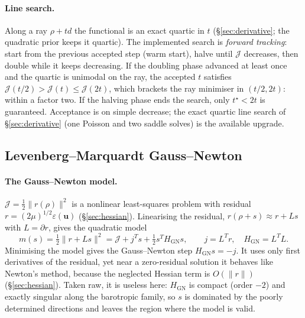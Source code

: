 \documentclass[11pt]{article}
\newcommand{\Jf}{\mathscr{J}}  %
\newcommand{\eps}{\varepsilon}
\newcommand{\bu}{\mathbf{u}}
\newcommand{\norm}[1]{\lVert #1 \rVert}
\begin{document}
\paragraph{Line search.} Along a ray $\rho + t d$ the functional is an
exact quartic in $t$ (\S\ref{sec:derivative}; the quadratic prior keeps it
quartic). The implemented search is \emph{forward tracking}: start from
the previous accepted step (warm start), halve until $\Jf $ decreases, then
double while it keeps decreasing. If the doubling phase advanced at least
once and the quartic is unimodal on the ray, the accepted $t$ satisfies
$\Jf (t/2) > \Jf (t) \le \Jf (2t)$, which brackets the ray minimiser in
$(t/2, 2t)$: within a factor two. If the halving phase ends the search,
only $t^\star < 2t$ is guaranteed. Acceptance is on simple decrease; the
exact quartic line search of \S\ref{sec:derivative} (one Poisson and two
saddle solves) is the available upgrade.

\subsection{Levenberg--Marquardt Gauss--Newton}
\label{sec:lm}

\paragraph{The Gauss--Newton model.} $\Jf  = \tfrac12\norm{r(\rho)}^2$ is a
nonlinear least-squares problem with residual $r = (2\mu)^{1/2}\eps(\bu)$
(\S\ref{sec:hessian}). Linearising the residual, $r(\rho + s) \approx r +
Ls$ with $L = \partial r$, gives the quadratic model
\begin{equation}
  m(s) = \tfrac12\norm{r + Ls}^2
       = \Jf  + j^{T}s + \tfrac12 s^{T}H_{\mathrm{GN}}s,
  \qquad j = L^{T}r,\quad H_{\mathrm{GN}} = L^{T}L .
\end{equation}
Minimising the model gives the Gauss--Newton step $H_{\mathrm{GN}}s = -j$.
It uses only first derivatives of the residual, yet near a zero-residual
solution it behaves like Newton's method, because the neglected Hessian
term is $O(\norm{r})$ (\S\ref{sec:hessian}). Taken raw, it is useless
here: $H_{\mathrm{GN}}$ is compact (order $-2$) and exactly singular along
the barotropic family, so $s$ is dominated by the poorly determined
directions and leaves the region where the model is valid.
\end{document}
